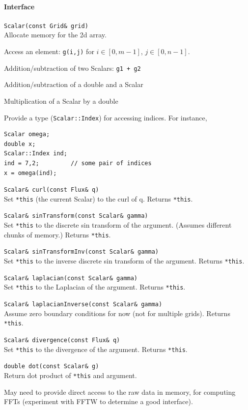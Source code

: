 \documentclass[11pt]{article}
\let\code\lstinline
\begin{document}
\paragraph{Interface}
\begin{description}
	\item \code|Scalar(const Grid& grid)|\\
	Allocate memory for the 2d array.
	\item Access an element: \code|g(i,j)| for $i\in[0,m-1]$, $j\in[0,n-1]$.
	\item Addition/subtraction of two Scalars: \code|g1 + g2|
	\item Addition/subtraction of a double and a Scalar
	\item Multiplication of a Scalar by a double
	\item Provide a type (\code|Scalar::Index|) for accessing indices.  For instance,
	\begin{lstlisting}
Scalar omega;
double x;
Scalar::Index ind;
ind = 7,2;         // some pair of indices
x = omega(ind);
	\end{lstlisting}
	\item \code|Scalar& curl(const Flux& q)|\\
	Set \code|*this| (the current Scalar) to the curl of q.  Returns \code|*this|.
	\item \code|Scalar& sinTransform(const Scalar& gamma)|\\
	Set \code|*this| to the discrete sin transform of the argument.  (Assumes different chunks of memory.)   Returns \code|*this|.
	\item \code|Scalar& sinTransformInv(const Scalar& gamma)|\\
	Set \code|*this| to the inverse discrete sin transform of the argument.   Returns \code|*this|.
	\item \code|Scalar& laplacian(const Scalar& gamma)|\\
	Set \code|*this| to the Laplacian of the argument.   Returns \code|*this|.
	\item \code|Scalar& laplacianInverse(const Scalar& gamma)|\\
	Assume zero boundary conditions for now (not for multiple grids).   Returns \code|*this|.
	\item \code|Scalar& divergence(const Flux& q)|\\
	Set \code|*this| to the divergence of the argument.   Returns \code|*this|.
	\item \code|double dot(const Scalar& g)|\\
	Return dot product of \code|*this| and argument.
	\item May need to provide direct access to the raw data in memory, for computing FFTs (experiment with FFTW to determine a good interface).
\end{description}
\end{document}
